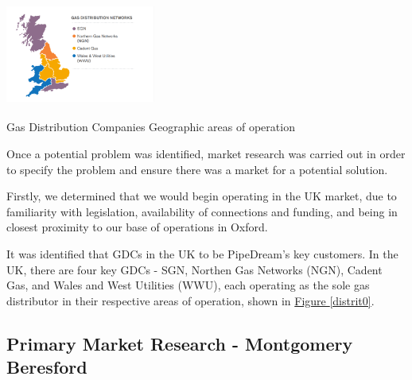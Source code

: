 \documentclass[11pt]{article}		%
\newcommand{\supercite}[1]{\textsuperscript{\cite{#1}}}		%
\newcommand{\figref}[1]{\hyperref[#1]{Figure \ref*{#1}}}    %
\begin{document}
		\begin{floatingfigure}[r]{0.4\textwidth}
		    \centering
	    	\includegraphics[width=0.37\textwidth]{distribution}
		    \caption{Gas Distribution Companies Geographic areas of operation\supercite{sönnichsen_5_2021}}
    	    \label{distrit0}
    	\end{floatingfigure}
        Once a potential problem was identified, market research was carried out in order to specify the problem and ensure there was a market for a potential solution. 

        Firstly, we determined that we would begin operating in the UK market, due to familiarity with legislation, availability of connections and funding, and being in closest proximity to our base of operations in Oxford. 
                                
		\begin{floatingfigure}[r]{0pt} \end{floatingfigure}
			
        It was identified that GDCs in the UK to be PipeDream's key customers. In the UK, there are four key GDCs - SGN, Northen Gas Networks (NGN), Cadent Gas, and Wales and West Utilities (WWU), each operating as the sole gas distributor in their respective areas of operation, shown in \figref{distrit0}. 

        \subsection[Primary Market Research]{Primary Market Research - Montgomery Beresford}
\end{document}
